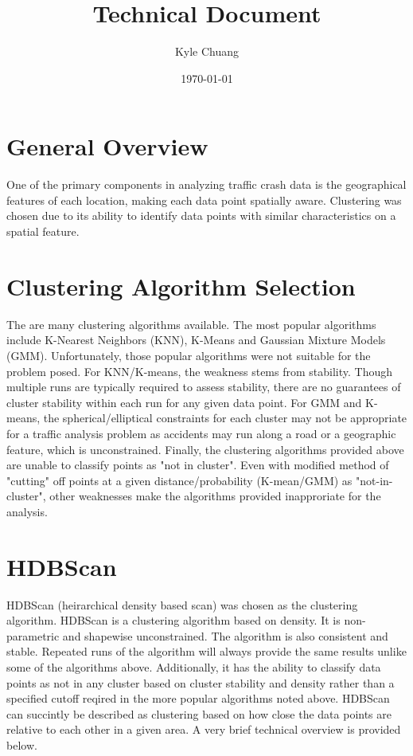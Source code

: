 \documentclass{article}
\begin{document}
\title{Technical Document}
\date{\today}
\author{Kyle Chuang}

\section{General Overview}
One of the primary components in analyzing traffic crash data is the geographical features of each location, making each data point spatially aware. Clustering was chosen due to its ability to identify data points with similar characteristics on a spatial feature.
\section{Clustering Algorithm Selection}
The are many clustering algorithms available. The most popular algorithms include K-Nearest Neighbors (KNN), K-Means and Gaussian Mixture Models (GMM). Unfortunately, those popular algorithms were not suitable for the problem posed. For KNN/K-means, the weakness stems from stability. Though multiple runs are typically required to assess stability, there are no guarantees of cluster stability within each run for any given data point. For GMM and K-means, the spherical/elliptical constraints for each cluster may not be appropriate for a traffic analysis problem as accidents may run along a road or a geographic feature, which is unconstrained. Finally, the clustering algorithms provided above are unable to classify points as "not in cluster". Even with modified method of "cutting" off points at a given distance/probability (K-mean/GMM) as "not-in-cluster", other weaknesses make the algorithms provided inapproriate for the analysis.

\section{HDBScan}
HDBScan (heirarchical density based scan) was chosen as the clustering algorithm. HDBScan is a clustering algorithm based on density. It is non-parametric and shapewise unconstrained. The algorithm is also consistent and stable. Repeated runs of the algorithm will always provide the same results unlike some of the algorithms above. Additionally, it has the ability to classify data points as not in any cluster based on cluster stability and density rather than a specified cutoff reqired in the more popular algorithms noted above.  HDBScan can succintly be described as clustering based on how close the data points are relative to each other in a given area. A very brief technical overview is provided below.
\end{document}
